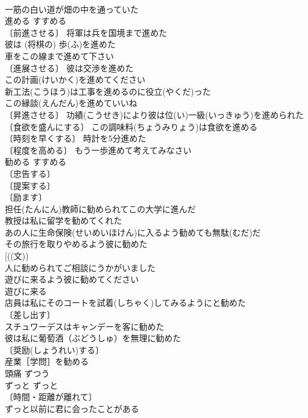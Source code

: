 \documentclass[8pt]{extreport}
\begin{document}
\begin{CJK}{UTF8}{min}
\\	一筋の白い道が畑の中を通っていた 
\\	進める	すすめる	
\\	〔前進させる〕 将軍は兵を国境まで進めた 
\\	彼は (将棋の) 歩(ふ)を進めた 
\\	車をこの線まで進めて下さい 
\\	〔進展させる〕 彼は交渉を進めた 
\\	この計画(けいかく)を進めてください 
\\	新工法(こうほう)は工事を進めるのに役立(やくだ)った 
\\	この縁談(えんだん)を進めていいね 
\\	〔昇進させる〕 功績(こうせき)により彼は位(い)一級(いっきゅう)を進められた 
\\	〔食欲を盛んにする〕 この調味料(ちょうみりょう)は食欲を進める 
\\	〔時刻を早くする〕 時計を5分進めた 
\\	〔程度を高める〕 もう一歩進めて考えてみなさい 
\\	勧める	すすめる	
\\	〔忠告する〕
\\	〔提案する〕
\\	〔励ます〕
\\	担任(たんにん)教師に勧められてこの大学に進んだ 
\\	教授は私に留学を勧めてくれた 
\\	あの人に生命保険(せいめいほけん)に入るよう勧めても無駄(むだ)だ 
\\	その旅行を取りやめるよう彼に勧めた 
\\	[((文)) 
\\	人に勧められてご相談にうかがいました 
\\	遊びに来るよう彼に勧めてください 
\\	遊びに来る　
\\	店員は私にそのコートを試着(しちゃく)してみるようにと勧めた 
\\	〔差し出す〕
\\	スチュワーデスはキャンデーを客に勧めた 
\\	彼は私に葡萄酒（ぶどうしゅ）を無理に勧めた 
\\	〔奨励(しょうれい)する〕
\\	産業［学問］を勧める 
\\	頭痛	ずつう	
\\	ずっと	ずっと	
\\	〔時間・距離が離れて〕　
\\	ずっと以前に君に会ったことがある 

\end{CJK}
\end{document}
